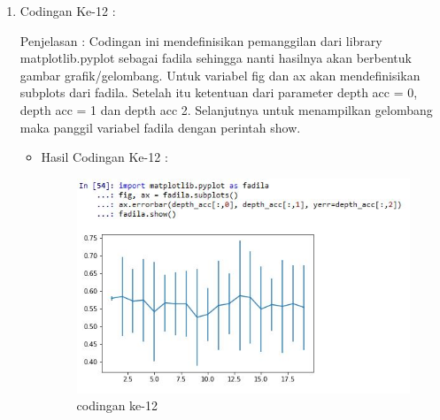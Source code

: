 \begin{enumerate}
\begin{enumerate}
\begin{itemize}
\end{itemize}
\par
\item Codingan Ke-12 :
\par Penjelasan : Codingan ini mendefinisikan pemanggilan dari library matplotlib.pyplot sebagai fadila sehingga nanti hasilnya akan berbentuk gambar grafik/gelombang. Untuk variabel fig dan ax akan mendefinisikan subplots dari fadila. Setelah itu ketentuan dari parameter depth acc = 0, depth acc = 1 dan depth acc 2. Selanjutnya untuk menampilkan gelombang maka panggil variabel fadila dengan perintah show.
\par 
\begin{itemize}
\par
\item Hasil Codingan Ke-12 :

\begin{figure}[ht]
\centering
\includegraphics[scale=0.4]{figures/hasil12.jpg}
\caption{codingan ke-12}
\label{contoh}
\end{figure}

\end{itemize}
\end{enumerate}
\end{enumerate}

